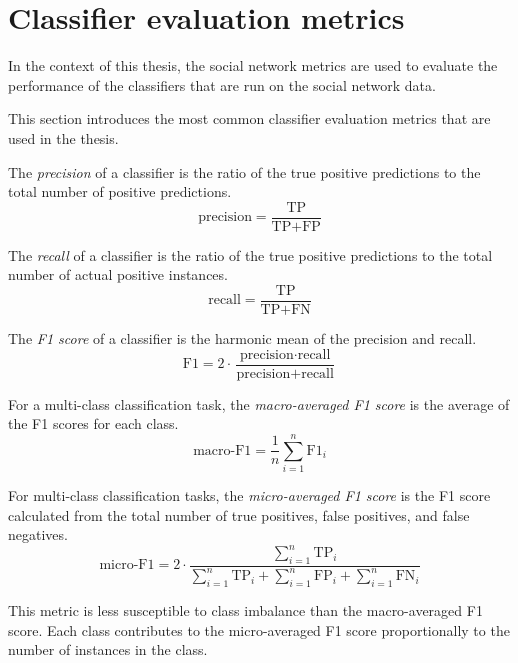 \section{Classifier evaluation metrics}

In the context of this thesis, the social network metrics are used to evaluate 
the performance of the classifiers that are run on the social network data.

This section introduces the most common classifier evaluation metrics that are used in the thesis.

\begin{definition}[Precision]
    The \textit{precision} of a classifier is the ratio of the true positive predictions to the total number of positive predictions.
    $$
    \text{precision} = \frac{\text{TP}}{\text{TP} + \text{FP}}
    $$
\end{definition}

\begin{definition}[Recall]
    The \textit{recall} of a classifier is the ratio of the true positive predictions to the total number of actual positive instances.
    $$
    \text{recall} = \frac{\text{TP}}{\text{TP} + \text{FN}}
    $$
\end{definition}

\begin{definition}[F1 score]
    The \textit{F1 score} of a classifier is the harmonic mean of the precision and recall.
    $$
    \text{F1} = 2 \cdot \frac{\text{precision} \cdot \text{recall}}{\text{precision} + \text{recall}}
    $$
\end{definition}

\begin{definition}
    For a multi-class classification task, the \textit{macro-averaged F1 score} is the average of the F1 scores for each class.
    $$
    \text{macro-F1} = \frac{1}{n} \sum_{i=1}^{n} \text{F1}_i
    $$
\end{definition}

\begin{definition}
    For multi-class classification tasks, the \textit{micro-averaged F1 score} is the F1 score calculated from the total number of true positives, false positives, and false negatives.
    $$
    \text{micro-F1} = 2 \cdot \frac{\sum_{i=1}^{n} \text{TP}_i}{\sum_{i=1}^{n} \text{TP}_i + \sum_{i=1}^{n} \text{FP}_i + \sum_{i=1}^{n} \text{FN}_i}
    $$

    This metric is less susceptible to class imbalance than the macro-averaged F1 score.
    Each class contributes to the micro-averaged F1 score proportionally to the number of instances in the class.
\end{definition}